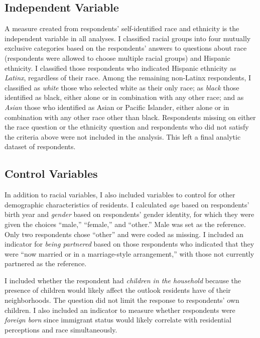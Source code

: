 \documentclass{baderart}
\newcommand{\TK}[1][]{\strong{TK #1}}
\begin{document}
\subsection{Independent Variable}\label{independent-variable}

A measure created from respondents' self-identified race and ethnicity is the independent variable in all analyses. I classified racial groups into four mutually exclusive categories based on the respondents' answers to questions about race (respondents were allowed to choose multiple racial groups) and Hispanic ethnicity. 
I classified those respondents who indicated Hispanic ethnicity as \emph{Latinx}, regardless of their race. Among the remaining non-Latinx respondents, I classified as \emph{white} those who selected white as their only race; as \emph{black} those identified as black, either alone or in combination with any other race; and as \emph{Asian} those who identified as Asian or Pacific Islander, either alone or in combination with any other race other than black. Respondents missing on either the race question or the ethnicity question and respondents who did not satisfy the criteria above were not included in the analysis. This left a final analytic dataset of \TK[N] respondents.

\subsection{Control Variables}\label{control-variables}

In addition to racial variables, I also included variables to control for other demographic characteristics of residents. I calculated \emph{age} based on respondents' birth year and \emph{gender} based on respondents' gender identity, for which they were given the choices ``male,'' ``female,'' and ``other.'' Male was set as the reference. Only two respondents chose ``other'' and were coded as missing. I included an indicator for \emph{being partnered} based on those respondents who indicated that they were ``now married or in a marriage-style arrangement,'' with those not currently partnered as the reference.

I included whether the respondent had \emph{children in the household} because the presence of children would likely affect the outlook residents have of their neighborhoods. The question did not limit the response to respondents' own children. I also included an indicator to measure whether respondents were \emph{foreign born} since immigrant status would likely correlate with residential perceptions and race simultaneously.
\end{document}
